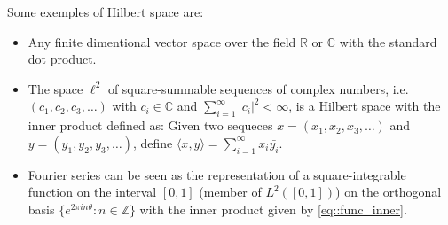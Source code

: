 Some exemples of Hilbert space are:

\begin{itemize}
  \item Any finite dimentional vector space over the field $\mathbb{R}$ or
  $\mathbb{C}$ with the standard dot product.
  \item The space $\ell^2$ of square-summable sequences of complex numbers, i.e.
  $(c_1,c_2,c_3,\ldots)$ with $c_i \in \mathbb{C}$ and $\sum_{i=1}^\infty |c_i|^2 <
  \infty$, is a Hilbert space with the inner product defined as: Given two sequeces
  $x=(x_1,x_2,x_3,\ldots)$ and $y=(y_1,y_2,y_3,\ldots)$, define $\langle x,y
  \rangle = \sum_{i=1}^\infty x_i \bar{y_i}$.
  \item Fourier series can be seen as the representation of a square-integrable
  function on the interval $[0,1]$ (member of $L^2([0,1])$) on the orthogonal
  basis $\{e^{2\pi i n \theta} : n \in \mathbb{Z}\}$ with the
  inner product given by \ref{eq::func_inner}.
\end{itemize}

